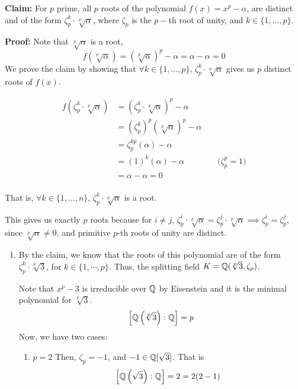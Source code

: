 \documentclass[12pt]{article}
\begin{document}
 \begin{solution}
    \bbni

    \textbf{Claim:} For $p$ prime, all $p$ roots of the polynomial $f(x) = x^p - \alpha$, are distinct and of the form $\zeta_p^k \cdot \sqrt[p]{\alpha}$, where $\zeta_p$ is the $p-$th root of unity, and $k \in \{ 1, \ldots, p \}$. 
        
    \textbf{Proof:} 
    Note that $\sqrt[p]{\alpha}$ is a root, 
    \[f(\sqrt[p]{\alpha}) = (\sqrt[p]{\alpha})^p - \alpha =  \alpha - \alpha = 0\]
    We prove the claim by showing that $\forall k \in \{1, \ldots, p\}$, $\zeta_p^k \cdot \sqrt[p]{\alpha}$ gives us $p$ distinct roots of $f(x)$.

    \begin{align*}
        f \left (\zeta_p^k \cdot \sqrt[p]{\alpha} \right ) &= \left (\zeta_p^k \cdot \sqrt[p]{\alpha} \right )^p - \alpha \\ 
        &= \left (\zeta_p^k \right )^p  \left (\sqrt[p]{\alpha} \right )^p  - \alpha \\ 
        &= \zeta_p^{kp} (\alpha) - \alpha \\ 
        &= (1)^k (\alpha) - \alpha  \qquad \qquad \text{($\zeta_p^p = 1$)} \\ 
        &= \alpha - \alpha = 0 \\ 
    \end{align*}
    
    That is, $\forall k \in \{1, \ldots, n\}$, $\zeta_p^k \cdot \sqrt[p]{\alpha}$ is a root. 

     This gives us exactly $p$ roots because for $i \neq j$, $\zeta_p^i \cdot \sqrt[p]{\alpha} = \zeta_p^j \cdot \sqrt[p]{\alpha} \implies \zeta_p^i = \zeta_p^j$, since $\sqrt[p]{\alpha} \neq 0$, and primitive $p$-th roots of unity are distinct. 


    \begin{enumerate}
        \item By the claim, we know that the roots of this polynomial are of the form $\zeta_p^k \cdot \sqrt[p]{3}$, for $k \in \{1, \cdots, p\}$. Thus, the splitting field $K = \mathbb Q(\sqrt[p]{3}, \zeta_p)$. 
        
        Note that $x^p - 3$ is irreducible over $\mathbb Q$ by Eisenstein and it is the minimal polynomial for $\sqrt[p]{3}$. 
        \[\left [\mathbb Q \left (\sqrt[p]{3} \right ): \mathbb Q \right ] = p\]
        Now, we have two cases:

        \begin{enumerate}
            \item $p =2$  
            Then, $\zeta_p = -1$, and $-1 \in \mathbb Q[\sqrt{3}]$. That is 
            \[\left [\mathbb Q \left (\sqrt{3} \right ) : \mathbb Q \right ] = 2 = 2(2-1)\]


\end{enumerate}
\end{enumerate}
\end{solution}
\end{document}
